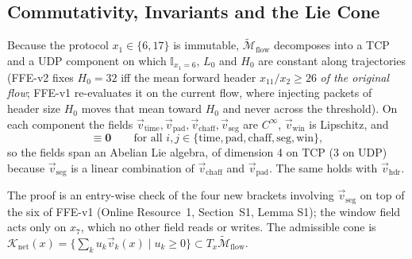 \subsection{Commutativity, Invariants and the Lie Cone}
\label{sec:invariants}

\begin{proposition}
\label{prop:lie_commutativity}
Because the protocol $x_1\in\{6,17\}$ is immutable, $\widetilde{\mathcal{M}}_{\text{flow}}$ decomposes into a TCP and a UDP component on which $\mathbb{I}_{x_1=6}$, $L_0$ and $H_0$ are constant along trajectories (FFE-v2 fixes $H_0=32$ iff the mean forward header $x_{11}/x_2\ge26$ \emph{of the original flow}; FFE-v1 re-evaluates it on the current flow, where injecting packets of header size $H_0$ moves that mean toward $H_0$ and never across the threshold). On each component the fields $\vec v_{\text{time}},\vec v_{\text{pad}},\vec v_{\text{chaff}},\vec v_{\text{seg}}$ are $C^\infty$, $\vec v_{\text{win}}$ is Lipschitz, and
\begin{equation}
    [\vec v_i,\vec v_j]\equiv\mathbf{0}\qquad\text{for all }i,j\in\{\text{time},\text{pad},\text{chaff},\text{seg},\text{win}\},
\end{equation}
so the fields span an Abelian Lie algebra, of dimension 4 on TCP (3 on UDP) because $\vec v_{\text{seg}}$ is a linear combination of $\vec v_{\text{chaff}}$ and $\vec v_{\text{pad}}$. The same holds with $\vec v_{\text{hdr}}$.
\end{proposition}
The proof is an entry-wise check of the four new brackets involving $\vec v_{\text{seg}}$ on top of the six of FFE-v1 (Online Resource~1, Section~S1, Lemma S1); the window field acts only on $x_7$, which no other field reads or writes. The admissible cone is $\mathcal{K}_{\text{net}}(x)=\{\sum_k u_k\vec v_k(x)\mid u_k\ge0\}\subset T_x\widetilde{\mathcal{M}}_{\text{flow}}$.

